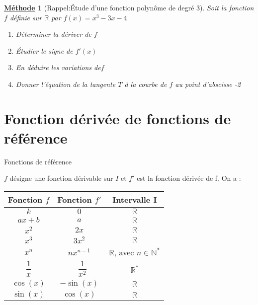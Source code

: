 \documentclass[11pt,a4paper]{article}
\def\R{{\mathbb R}}
\def\N{{\mathbb N}}
\renewcommand{\arraystretch}{}
\theoremstyle{break}
\newtheorem{Meth}{\underline{Méthode}}
\begin{document}
\begin{Meth}[Rappel:Étude d'une fonction polynôme de degré 3]
Soit la fonction $f$ définie sur $\R$ par $f(x)=x^3-3x-4$
\begin{enumerate}
	\item Déterminer la dériver de $f$
	\item Étudier le signe de $f'(x)$
	\item En déduire les variations de$f$
	\item Donner l'équation de la tangente $T$ à la courbe de $f$ au point d'abscisse -2
	
\end{enumerate}
\end{Meth}
\newpage
\section{Fonction dérivée de fonctions de référence} 


	\begin{bclogo}[couleur = yellow!30, arrondi = 0.1,logo=\bcbook]{Fonctions de référence}
	\begin{minipage}{0.9\textwidth}
	$f$ désigne une fonction dérivable sur $I$ et $f'$ est la fonction dérivée de f. On a : 
	\begin{center}
	\renewcommand{\arraystretch}{1.5}
	\begin{tabular}{|C{2.5}|C{2.5}|C{2.5}|}
	\hline 
	Fonction $f$ & Fonction $f'$ & Intervalle I \\ 
	\hline  
	$k$ & $0$ & $\R$ \\ 
	\hline  
	$ax+b$ & $a$ & $\R$ \\ 
	\hline
	$x^2$ & $2x$ & $\R$ \\ 
	\hline
	$x^3$ & $3x^2$ & $\R$ \\ 
	\hline
	$x^n$ & $n x^{n-1}$ & $\R$, avec $n\in\N^*$ \\
	\hline    
	\rule{0cm}{0.65cm}
	$\dfrac{1}{x}$ & $ -\dfrac{1}{x^2}$ & $\R^*$ \\ [0.2cm]
	\hline
	$\cos(x)$ & $ -\sin(x)$ & $\R$ \\
	\hline
	$\sin(x)$ & $\cos(x)$ & $\R$ \\
	\hline
	
	\end{tabular}
	\end{center}
	
	\end{minipage}
	
\end{bclogo}
\end{document}
